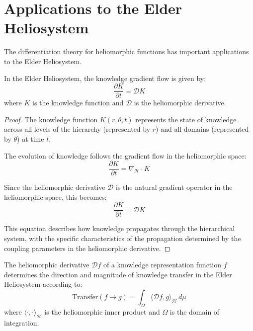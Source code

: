 \section{Applications to the Elder Heliosystem}

The differentiation theory for heliomorphic functions has important applications to the Elder Heliosystem.

\begin{theorem}
In the Elder Heliosystem, the knowledge gradient flow is given by:
\begin{equation}
\frac{\partial K}{\partial t} = \mathcal{D}K
\end{equation}
where $K$ is the knowledge function and $\mathcal{D}$ is the heliomorphic derivative.
\end{theorem}

\begin{proof}
The knowledge function $K(r,\theta,t)$ represents the state of knowledge across all levels of the hierarchy (represented by $r$) and all domains (represented by $\theta$) at time $t$.

The evolution of knowledge follows the gradient flow in the heliomorphic space:
\begin{equation}
\frac{\partial K}{\partial t} = \nabla_{\mathcal{H}} \cdot K
\end{equation}

Since the heliomorphic derivative $\mathcal{D}$ is the natural gradient operator in the heliomorphic space, this becomes:
\begin{equation}
\frac{\partial K}{\partial t} = \mathcal{D}K
\end{equation}

This equation describes how knowledge propagates through the hierarchical system, with the specific characteristics of the propagation determined by the coupling parameters in the heliomorphic derivative.
\end{proof}

\begin{theorem}
The heliomorphic derivative $\mathcal{D}f$ of a knowledge representation function $f$ determines the direction and magnitude of knowledge transfer in the Elder Heliosystem according to:
\begin{equation}
\text{Transfer}(f \to g) = \int_{\Omega} \langle \mathcal{D}f, g \rangle_{\mathcal{H}} \, d\mu
\end{equation}
where $\langle \cdot, \cdot \rangle_{\mathcal{H}}$ is the heliomorphic inner product and $\Omega$ is the domain of integration.
\end{theorem}

